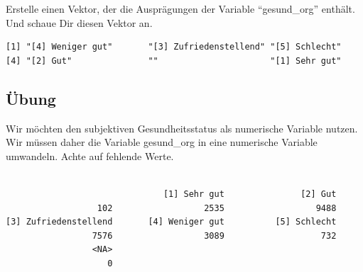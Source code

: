 \documentclass[
  letterpaper,
  DIV=11,
  numbers=noendperiod]{scrartcl}
\newenvironment{Shaded}{\begin{snugshade}}{\end{snugshade}}
\newcommand{\AttributeTok}[1]{\textcolor[rgb]{0.40,0.45,0.13}{#1}}
\newcommand{\CommentTok}[1]{\textcolor[rgb]{0.37,0.37,0.37}{#1}}
\newcommand{\FunctionTok}[1]{\textcolor[rgb]{0.28,0.35,0.67}{#1}}
\newcommand{\NormalTok}[1]{\textcolor[rgb]{0.00,0.23,0.31}{#1}}
\newcommand{\OtherTok}[1]{\textcolor[rgb]{0.00,0.23,0.31}{#1}}
\newcommand{\SpecialCharTok}[1]{\textcolor[rgb]{0.37,0.37,0.37}{#1}}
\newcommand{\StringTok}[1]{\textcolor[rgb]{0.13,0.47,0.30}{#1}}
\begin{document}
Erstelle einen Vektor, der die Ausprägungen der Variable ``gesund\_org''
enthält. Und schaue Dir diesen Vektor an.

\begin{Shaded}
\end{Shaded}

\begin{verbatim}
[1] "[4] Weniger gut"       "[3] Zufriedenstellend" "[5] Schlecht"         
[4] "[2] Gut"               ""                      "[1] Sehr gut"         
\end{verbatim}

\subsection{Übung}\label{uxfcbung-7}

Wir möchten den subjektiven Gesundheitsstatus als numerische Variable
nutzen. Wir müssen daher die Variable gesund\_org in eine numerische
Variable umwandeln. Achte auf fehlende Werte.

\begin{Shaded}
\end{Shaded}

\begin{verbatim}

                               [1] Sehr gut               [2] Gut 
                  102                  2535                  9488 
[3] Zufriedenstellend       [4] Weniger gut          [5] Schlecht 
                 7576                  3089                   732 
                 <NA> 
                    0 
\end{verbatim}
\end{document}

